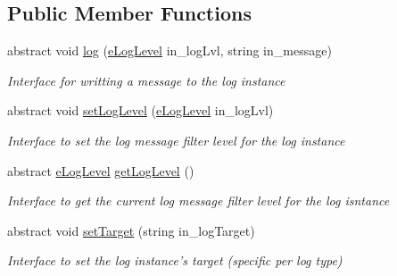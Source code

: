 \subsection*{Public Member Functions}
\begin{DoxyCompactItemize}
\item 
abstract void \hyperlink{class_b_m_s_1_1_core_1_1_b_m_s___logger_a97d054fecacfeb7aadae1f60d35016f2}{log} (\hyperlink{namespace_b_m_s_1_1_core_a327c4f5128504a45ef61f00cfd661a43}{e\-Log\-Level} in\-\_\-log\-Lvl, string in\-\_\-message)
\begin{DoxyCompactList}\small\item\em Interface for writting a message to the log instance \end{DoxyCompactList}\item 
abstract void \hyperlink{class_b_m_s_1_1_core_1_1_b_m_s___logger_a5d81080fcbf80bb7246284a725b78cf6}{set\-Log\-Level} (\hyperlink{namespace_b_m_s_1_1_core_a327c4f5128504a45ef61f00cfd661a43}{e\-Log\-Level} in\-\_\-log\-Lvl)
\begin{DoxyCompactList}\small\item\em Interface to set the log message filter level for the log instance \end{DoxyCompactList}\item 
abstract \hyperlink{namespace_b_m_s_1_1_core_a327c4f5128504a45ef61f00cfd661a43}{e\-Log\-Level} \hyperlink{class_b_m_s_1_1_core_1_1_b_m_s___logger_ad5812e0e63b7e23ff67d91b14e4af505}{get\-Log\-Level} ()
\begin{DoxyCompactList}\small\item\em Interface to get the current log message filter level for the log isntance \end{DoxyCompactList}\item 
abstract void \hyperlink{class_b_m_s_1_1_core_1_1_b_m_s___logger_af494d7578070ae9b6d779c9ecc0392d7}{set\-Target} (string in\-\_\-log\-Target)
\begin{DoxyCompactList}\small\item\em Interface to set the log instance's target (specific per log type) \end{DoxyCompactList}\end{DoxyCompactItemize}

